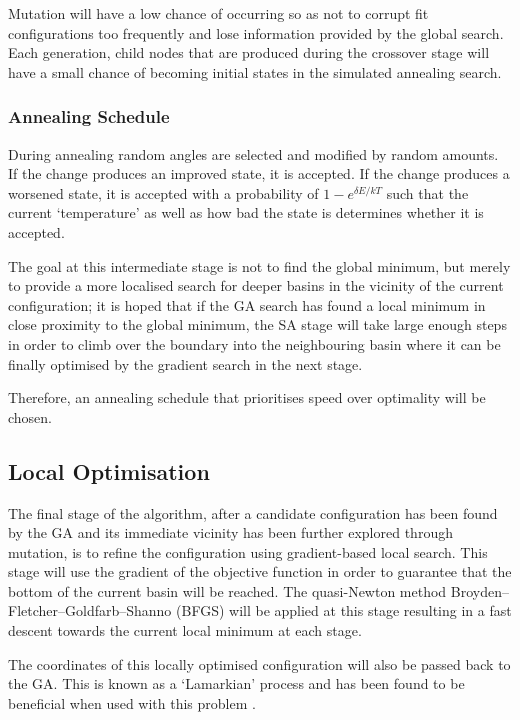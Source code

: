 \documentclass{article}
\begin{document}
Mutation will have a low chance of occurring so as not to corrupt fit
configurations too frequently and lose information provided by the global
search. Each generation, child nodes that are produced during the crossover
stage will have a small chance of becoming initial states in the simulated
annealing search.

\subsubsection{Annealing Schedule}

During annealing random angles are selected and modified by random amounts. If
the change produces an improved state, it is accepted. If the change produces a
worsened state, it is accepted with a probability of $1 - e^{\delta E / kT}$
such that the current `temperature' as well as how bad the state is determines
whether it is accepted.

The goal at this intermediate stage is not to find the global minimum, but
merely to provide a more localised search for deeper basins in the vicinity of
the current configuration; it is hoped that if the GA search has found a local
minimum in close proximity to the global minimum, the SA stage will take large
enough steps in order to climb over the boundary into the neighbouring basin
where it can be finally optimised by the gradient search in the next stage.

Therefore, an annealing schedule that prioritises speed over optimality will be
chosen.

\subsection{Local Optimisation}

The final stage of the algorithm, after a candidate configuration has been found
by the GA and its immediate vicinity has been further explored through mutation,
is to refine the configuration using gradient-based local search. This stage
will use the gradient of the objective function in order to guarantee that the
bottom of the current basin will be reached. The quasi-Newton method
Broyden–Fletcher–Goldfarb–Shanno (BFGS) will be applied at this stage resulting
in a fast descent towards the current local minimum at each stage.

The coordinates of this locally optimised configuration will also be passed back
to the GA. This is known as a `Lamarkian' process and has been found to be
beneficial when used with this problem \cite{doi:10.1002/qua.560440214}.
\end{document}
